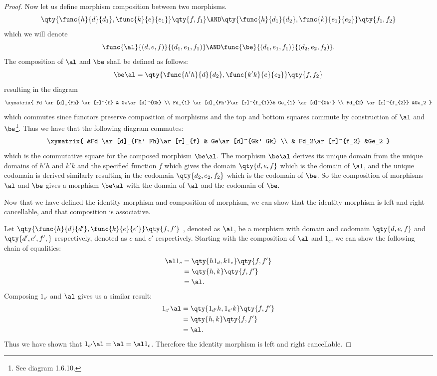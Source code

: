 \documentclass[main.tex]{subfiles}
\begin{document}
\begin{proof}
	Now let us define morphism composition between two morphisms.
	$$\qty{\func{h}{d}{d_1},\func{k}{e}{e_1}} \qty{f,f_1} \AND 
	\qty{\func{h}{d_1}{d_2},\func{k}{e_1}{e_2}} \qty{f_1,f_2}$$ which we will
	denote $$\func{\al}{(d,e,f)}{(d_1,e_1,f_1)} \AND
	\func{\be}{(d_1,e_1,f_1)}{(d_2,e_2,f_2)}.$$
	The composition of $\al$ and $\be$ shall be defined as follows:
	\[\be  \al=\qty{\func{h'  h}{d}{d_{2}},\func{k'  k}{e}{e_{2}}}\qty{f,f_2}\]
	resulting in the diagram
	\[\xymatrix{ Fd \ar[d]_{Fh} \ar[r]^{f} & Ge\ar[d]^{Gk}  \\
			Fd_{1} \ar[d]_{Fh'}\ar[r]^{f_{1}}& Ge_{1} \ar[d]^{Gk'} \\
	Fd_{2} \ar[r]^{f_{2}} &Ge_2 } \]
	which commutes since functors preserve composition of morphisms and the top
	and bottom squares commute by construction of $\al$ and $\be$\footnote{See diagram 1.6.10.}. Thus we have
	that the following diagram commutes:
	\[\xymatrix{ &Fd \ar[d]_{Fh'  Fh}\ar[r]_{f} & Ge\ar[d]^{Gk' Gk}
			 \\  & Fd_2\ar[r]^{f_2} &Ge_2 }\]
	which is the commutative square for the composed morphism $\be  \al$.
	The morphism $\be \al$ derives its unique domain from the unique
	domains of $h' h$ and $k' k$ and the specified function $f$
	which gives the domain $\qty{d,e,f}$ which is the domain of $\al$, and the
	unique codomain is derived similarly resulting in the codomain
	$\qty{d_2,e_2,f_2}$ which is the codomain of $\be$. So the composition of
	morphisms $\al$ and $\be$ gives a morphism $\be \al$ with the domain
	of $\al$ and the codomain of $\be.$

	Now that we have defined the identity morphism and composition of morphism,
	we can show that the identity morphism is left and right cancellable, and
	that composition is associative.

	Let $\qty{\func{h}{d}{d'},\func{k}{e}{e'}} \qty{f,f'}$ , denoted as $\al$,
	be a morphism with domain and codomain $\qty{d,e,f}$ and $\qty{d',e',f',}$
	respectively, denoted as $c$ and $c'$ respectively. Starting with the
	composition of $\al$ and $1_{c}$, we can show the following chain of
	equalities:
	\begin{align*}
	\al  1_{c } &= \qty{h 1_{d},k 1_{e}}\qty{f,f'}\\
	&= \qty{h,k}\qty{f,f'} \\
	 &= \al.
	\end{align*}
	Composing  $1_{c'}$ and $\al$ gives us a similar result:
	\begin{align*}
	1_{c' } \al &= \qty{1_{d'} h, 1_{e'} k}\qty{f,f'}\\
	&= \qty{h,k}\qty{f,f'}\\
	&= \al.
	\end{align*} 
	Thus we have shown
	that $1_{c' } \al = \al = \al 1_{c}$. Therefore the identity
	morphism is left and right cancellable.


\end{proof}
\end{document}
